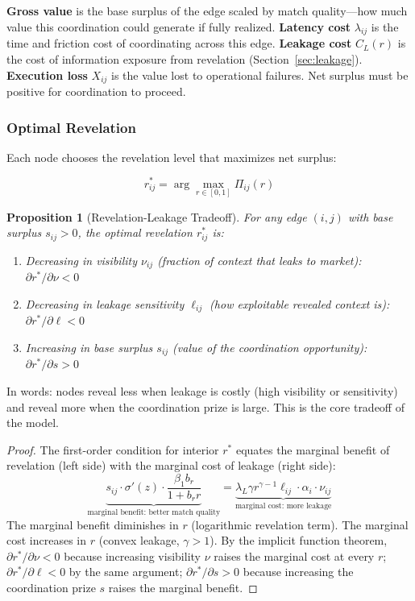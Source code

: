 \documentclass[12pt]{article}
\newtheorem{proposition}{Proposition}
\theoremstyle{definition}
\begin{document}
\noindent \textbf{Gross value} is the base surplus of the edge scaled by match quality---how much value this coordination could generate if fully realized. \textbf{Latency cost} $\lambda_{ij}$ is the time and friction cost of coordinating across this edge. \textbf{Leakage cost} $C_L(r)$ is the cost of information exposure from revelation (Section~\ref{sec:leakage}). \textbf{Execution loss} $X_{ij}$ is the value lost to operational failures. Net surplus must be positive for coordination to proceed.

\subsubsection{Optimal Revelation}

Each node chooses the revelation level that maximizes net surplus:

\begin{equation}
\label{eq:optrev}
r^*_{ij} = \arg\max_{r \in [0,1]} \Pi_{ij}(r)
\end{equation}

\begin{proposition}[Revelation-Leakage Tradeoff]
\label{prop:tradeoff}
For any edge $(i,j)$ with base surplus $s_{ij} > 0$, the optimal revelation $r^*_{ij}$ is:
\begin{enumerate}
\item[(i)] Decreasing in visibility $\nu_{ij}$ (fraction of context that leaks to market): $\partial r^* / \partial \nu < 0$
\item[(ii)] Decreasing in leakage sensitivity $\ell_{ij}$ (how exploitable revealed context is): $\partial r^* / \partial \ell < 0$
\item[(iii)] Increasing in base surplus $s_{ij}$ (value of the coordination opportunity): $\partial r^* / \partial s > 0$
\end{enumerate}
\end{proposition}

\noindent In words: nodes reveal less when leakage is costly (high visibility or sensitivity) and reveal more when the coordination prize is large. This is the core tradeoff of the model.

\begin{proof}
The first-order condition for interior $r^*$ equates the marginal benefit of revelation (left side) with the marginal cost of leakage (right side):
\[
\underbrace{s_{ij} \cdot \sigma'(z) \cdot \frac{\beta_1 b_r}{1 + b_r r}}_{\text{marginal benefit: better match quality}} = \underbrace{\lambda_L \gamma r^{\gamma-1} \ell_{ij} \cdot \alpha_i \cdot \nu_{ij}}_{\text{marginal cost: more leakage}}
\]
The marginal benefit diminishes in $r$ (logarithmic revelation term). The marginal cost increases in $r$ (convex leakage, $\gamma > 1$). By the implicit function theorem, $\partial r^* / \partial \nu < 0$ because increasing visibility $\nu$ raises the marginal cost at every $r$; $\partial r^* / \partial \ell < 0$ by the same argument; $\partial r^* / \partial s > 0$ because increasing the coordination prize $s$ raises the marginal benefit.
\end{proof}
\end{document}
